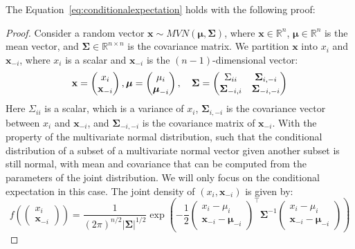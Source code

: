 The Equation~\ref{eq:conditionalexpectation} holds with the following proof: 
\begin{proof}
    Consider a random vector $\mathbf{x}\sim MVN(\boldsymbol{\mu},\boldsymbol{\Sigma})$, where $\mathbf{x}\in \mathbb{R}^n$, $\boldsymbol{\mu}\in\mathbb{R}^n$ is the mean vector, and $\boldsymbol{\Sigma}\in\mathbb{R}^{n\times n}$ is the covariance matrix.
    We partition $\mathbf{x}$ into $x_i$ and $\mathbf{x}_{-i}$, where $x_i$ is a scalar and $\mathbf{x}_{-i}$ is the $(n-1)$-dimensional vector:
    \begin{equation*}
        \mathbf{x}=\begin{pmatrix} x_i \\ \mathbf{x}_{-i} \end{pmatrix},\\ \boldsymbol{\mu} = \begin{pmatrix} \mu_i \\ \boldsymbol{\mu}_{-i} \end{pmatrix},\quad \boldsymbol{\Sigma}=\begin{pmatrix} \Sigma_{ii} & \boldsymbol{\Sigma}_{i,-i}\\ \boldsymbol{\Sigma}_{-i,i} & \boldsymbol{\Sigma}_{-i,-i} \end{pmatrix}
    \end{equation*}
    Here $\Sigma_{ii}$ is a scalar, which is a variance of $x_i$, $\boldsymbol{\Sigma}_{i,-i}$ is the covariance vector between $x_i$ and $\mathbf{x}_{-i}$, and $\boldsymbol{\Sigma}_{-i,-i}$ is the covariance matrix of $\mathbf{x}_{-i}$. 
    With the property of the multivariate normal distribution, such that the conditional distribution of a subset of a multivariate normal vector given another subset is still normal, with mean and covariance that can be computed from the parameters of the joint distribution. 
    We will only focus on the conditional expectation in this case. 
    The joint density of $(x_i, \mathbf{x}_{-i})$ is given by: 
    \begin{equation*}
        f\left ( \begin{pmatrix} x_i \\ \mathbf{x}_{-i} \end{pmatrix} \right ) = \frac{1}{(2\pi)^{n/2} |\boldsymbol{\Sigma}|^{1/2}} \exp \left ( -\frac{1}{2} \begin{pmatrix} x_i - \mu_i \\ \mathbf{x}_{-i} - \boldsymbol{\mu}_{-i} \end{pmatrix}^{\top} \boldsymbol{\Sigma}^{-1} \begin{pmatrix} x_i - \mu_i \\ \mathbf{x}_{-i} - \boldsymbol{\mu}_{-i} \end{pmatrix} \right )

\end{equation*}
\end{proof}
